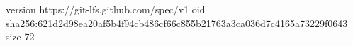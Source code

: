 version https://git-lfs.github.com/spec/v1
oid sha256:621d2d98ea20af5b4f94cb486cf66c855b21763a3ca036d7c4165a73229f0643
size 72
